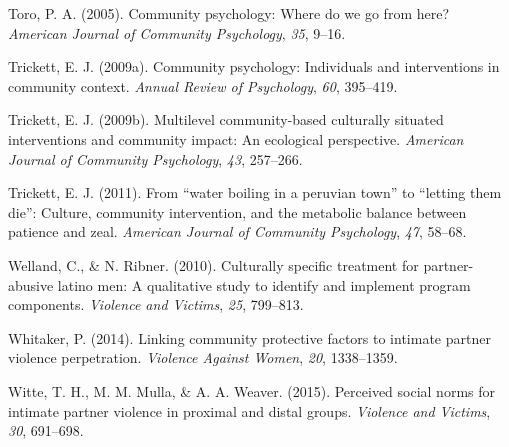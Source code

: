 \documentclass[11pt,]{tufte-book}
\begin{document}
\hypertarget{ref-toro2005community}{}
Toro, P. A. (2005). Community psychology: Where do we go from here?
\emph{American Journal of Community Psychology}, \emph{35}, 9--16.

\hypertarget{ref-trickett2009community}{}
Trickett, E. J. (2009a). Community psychology: Individuals and
interventions in community context. \emph{Annual Review of Psychology},
\emph{60}, 395--419.

\hypertarget{ref-trickett2009multilevel}{}
Trickett, E. J. (2009b). Multilevel community-based culturally situated
interventions and community impact: An ecological perspective.
\emph{American Journal of Community Psychology}, \emph{43}, 257--266.

\hypertarget{ref-trickett2011water}{}
Trickett, E. J. (2011). From ``water boiling in a peruvian town'' to
``letting them die'': Culture, community intervention, and the metabolic
balance between patience and zeal. \emph{American Journal of Community
Psychology}, \emph{47}, 58--68.

\hypertarget{ref-welland2010culturally}{}
Welland, C., \& N. Ribner. (2010). Culturally specific treatment for
partner-abusive latino men: A qualitative study to identify and
implement program components. \emph{Violence and Victims}, \emph{25},
799--813.

\hypertarget{ref-whitaker2014linking}{}
Whitaker, P. (2014). Linking community protective factors to intimate
partner violence perpetration. \emph{Violence Against Women}, \emph{20},
1338--1359.

\hypertarget{ref-witte2015perceived}{}
Witte, T. H., M. M. Mulla, \& A. A. Weaver. (2015). Perceived social
norms for intimate partner violence in proximal and distal groups.
\emph{Violence and Victims}, \emph{30}, 691--698.
\end{document}
